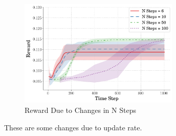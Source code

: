 \documentclass[10pt,twocolumn,letterpaper]{article}
\begin{document}
\begin{figure}[tb]
\begin{center}
        \includegraphics[width = 3in]{figures/ppo_n_steps/avg_rew_ppo.png}
        \caption{Reward Due to Changes in N Steps}
        \label{fig:n_steps}
\end{center}
\end{figure}

These are some changes due to update rate.
\end{document}
